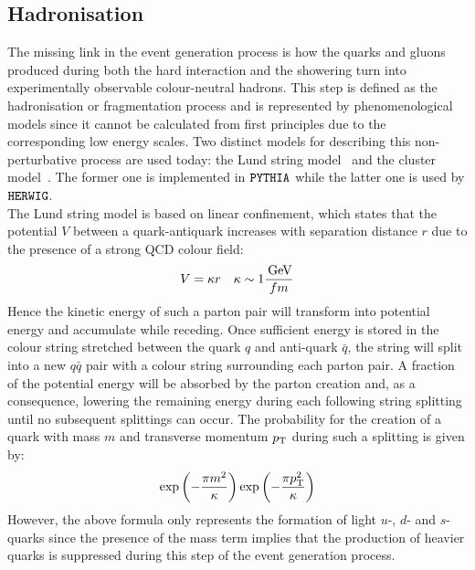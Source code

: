 \subsection{Hadronisation} \label{sec::Hadronisation}
The missing link in the event generation process is how the quarks and gluons produced during both the hard interaction and the showering turn into experimentally observable colour-neutral hadrons. This step is defined as the hadronisation or fragmentation process and is represented by phenomenological models since it cannot be calculated from first principles due to the corresponding low energy scales.
Two distinct models for describing this non-perturbative process are used today: the Lund string model~\cite{Lund} and the cluster model~\cite{ClusterModel}. The former one is implemented in $\texttt{PYTHIA}$ while the latter one is used by $\texttt{HERWIG}$.
\\
The Lund string model is based on linear confinement, which states that the potential $V$ between a quark-antiquark increases with separation distance $r$ due to the presence of a strong QCD colour field: %
\begin{equation}\label{eq::VQCD}
 V = \kappa r ~~~ \kappa \sim 1 \dfrac{\, \mathrm{GeV}}{fm}
\end{equation}
Hence the kinetic energy of such a parton pair will transform into potential energy and accumulate while receding. 
Once sufficient energy is stored in the colour string stretched between the quark $q$ and anti-quark $\bar{q}$, the string will split into a new $q\bar{q}$ pair with a colour string surrounding each parton pair.
A fraction of the potential energy will be absorbed by the parton creation and, as a consequence, lowering the remaining energy during each following string splitting until no subsequent splittings can occur.
The probability for the creation of a quark with mass $m$ and transverse momentum $p_{\rm T}$ during such a splitting is given by:
\begin{equation}\label{eq::mBot}
 \exp \left( -\frac{\pi m^{2}}{\kappa} \right) \exp \left(-\frac{\pi p_{\rm T}^{2}}{\kappa} \right)
\end{equation}
However, the above formula only represents the formation of light $u$-, $d$- and $s$-quarks since the presence of the mass term implies that the production of heavier quarks is suppressed during this step of the event generation process. 
